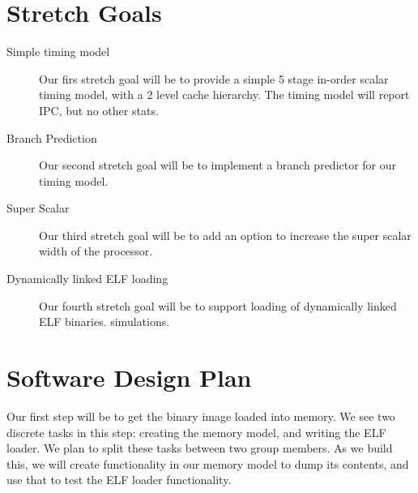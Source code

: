\documentclass[12pt]{article}
\begin{document}
\section{Stretch Goals}

\begin{description}
\item[Simple timing model] Our firs stretch goal will be to provide a
  simple 5 stage in-order scalar timing model, with a 2 level cache
  hierarchy.  The timing model will report IPC, but no other stats.
\item[Branch Prediction] Our second stretch goal will be to implement a
  branch predictor for our timing model.
\item[Super Scalar] Our third stretch goal will be to add an option to
  increase the super scalar width of the processor.
\item[Dynamically linked ELF loading] Our fourth stretch goal will be
  to support loading of dynamically linked ELF binaries.
  simulations.
\end{description}


\section{Software Design Plan}
%
%
%

Our first step will be to get the binary image loaded into memory.  We
see two discrete tasks in this step: creating the memory model, and
writing the ELF loader.  We plan to split these tasks between two
group members.  As we build this, we will create functionality in
our memory model to dump its contents, and use that to test the ELF
loader functionality.
\end{document}

